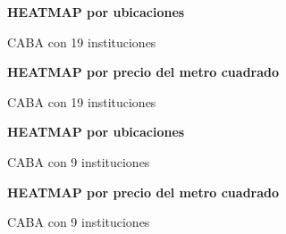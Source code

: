 \documentclass[a4paper, 10pt]{article}
\begin{document}
				\begin{figure}[H]
    				\centering
    				\textbf{HEATMAP por ubicaciones}\par\medskip
    				\caption{CABA con 19 instituciones}
				\end{figure}				
				\begin{figure}[H]
    				\centering
    				\textbf{HEATMAP por precio del metro cuadrado}\par\medskip
    				\caption{CABA con 19 instituciones}
				\end{figure}				
				\begin{figure}[H]
    				\centering
    				\textbf{HEATMAP por ubicaciones}\par\medskip
    				\caption{CABA con 9 instituciones}
				\end{figure}				
				\begin{figure}[H]
    				\centering
    				\textbf{HEATMAP por precio del metro cuadrado}\par\medskip
    				\caption{CABA con 9 instituciones}
				\end{figure}				
\end{document}
